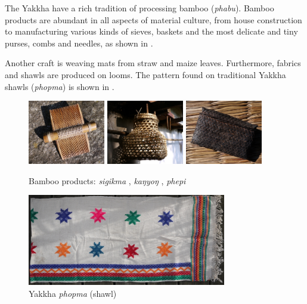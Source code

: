 The Yakkha have a rich tradition of processing bamboo (\emph{phabu}). Bamboo products are abundant in all aspects  of material culture, from house construction to manufacturing various kinds of sieves, baskets and the most delicate and tiny purses, combs and needles, as shown in .

Another craft is weaving mats from straw and maize leaves. Furthermore, fabrics and shawls are produced on looms.  The pattern found on traditional Yakkha shawls (\emph{phopma}) is shown in . 


 \begin{figure}[h]
 \includegraphics[width=0.30\textwidth]{figures/comb.jpg}
 \hfill
 \includegraphics[width=0.30\textwidth]{figures/kangyong.jpg}
 \hfill
 \includegraphics[width=0.30\textwidth]{figures/phepi.jpg}
 \caption{Bamboo  products: \emph{sigikma} , \emph{kaŋyoŋ} , \emph{phepi} }\label{phabu}
 \end{figure}



\begin{figure}[h]
\centering
\includegraphics[height=4cm]{figures/phopma.jpg}
\caption{Yakkha \emph{phopma} (shawl)}\label{phopma}
\end{figure}

